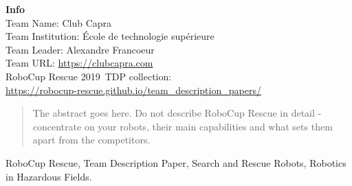 \documentclass[journal]{IEEEtran}
\newcommand{\TDPvenue}{2019~}
\begin{document}







\maketitle




\begin{flushleft}
\textbf{Info}\\
\hspace{10pt} Team Name: \hfill Club Capra\\
\hspace{10pt} Team Institution: \hfill \'Ecole de technologie sup\'erieure\\
\hspace{10pt} Team Leader: \hfill Alexandre Francoeur\\
\hspace{10pt} Team URL: \hfill \url{https://clubcapra.com}
\\
\vspace{5pt}
\hspace{10pt} RoboCup Rescue \TDPvenue TDP collection: \\
\hfill \url{https://robocup-rescue.github.io/team_description_papers/}
\end{flushleft}

\begin{abstract}
The abstract goes here. Do not describe RoboCup Rescue in detail - concentrate on your robots, their main capabilities and what sets them apart from the competitors.
\end{abstract}

\begin{IEEEkeywords}
RoboCup Rescue, Team Description Paper, Search and Rescue Robots, Robotics in Hazardous Fields.
\end{IEEEkeywords}
\end{document}
